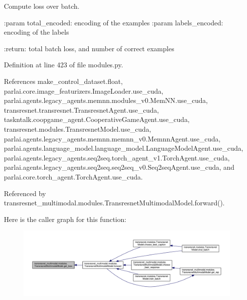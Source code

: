 \begin{DoxyVerb}Compute loss over batch.

:param total_encoded:
    encoding of the examples
:param labels_encoded:
    encoding of the labels

:return:
    total batch loss, and number of correct examples
\end{DoxyVerb}
 

Definition at line 423 of file modules.\+py.



References make\+\_\+control\+\_\+dataset.\+float, parlai.\+core.\+image\+\_\+featurizers.\+Image\+Loader.\+use\+\_\+cuda, parlai.\+agents.\+legacy\+\_\+agents.\+memnn.\+modules\+\_\+v0.\+Mem\+N\+N.\+use\+\_\+cuda, transresnet.\+transresnet.\+Transresnet\+Agent.\+use\+\_\+cuda, taskntalk.\+coopgame\+\_\+agent.\+Cooperative\+Game\+Agent.\+use\+\_\+cuda, transresnet.\+modules.\+Transresnet\+Model.\+use\+\_\+cuda, parlai.\+agents.\+legacy\+\_\+agents.\+memnn.\+memnn\+\_\+v0.\+Memnn\+Agent.\+use\+\_\+cuda, parlai.\+agents.\+language\+\_\+model.\+language\+\_\+model.\+Language\+Model\+Agent.\+use\+\_\+cuda, parlai.\+agents.\+legacy\+\_\+agents.\+seq2seq.\+torch\+\_\+agent\+\_\+v1.\+Torch\+Agent.\+use\+\_\+cuda, parlai.\+agents.\+legacy\+\_\+agents.\+seq2seq.\+seq2seq\+\_\+v0.\+Seq2seq\+Agent.\+use\+\_\+cuda, and parlai.\+core.\+torch\+\_\+agent.\+Torch\+Agent.\+use\+\_\+cuda.



Referenced by transresnet\+\_\+multimodal.\+modules.\+Transresnet\+Multimodal\+Model.\+forward().

Here is the caller graph for this function\+:
\nopagebreak
\begin{figure}[H]
\begin{center}
\leavevmode
\includegraphics[width=350pt]{classtransresnet__multimodal_1_1modules_1_1TransresnetMultimodalModel_affb7977abac6a4671c8d31456345fb58_icgraph}
\end{center}
\end{figure}
\mbox{\label{classtransresnet__multimodal_1_1modules_1_1TransresnetMultimodalModel_a9c07e36d8eb4e3321a61783e7b0931bd}} 
